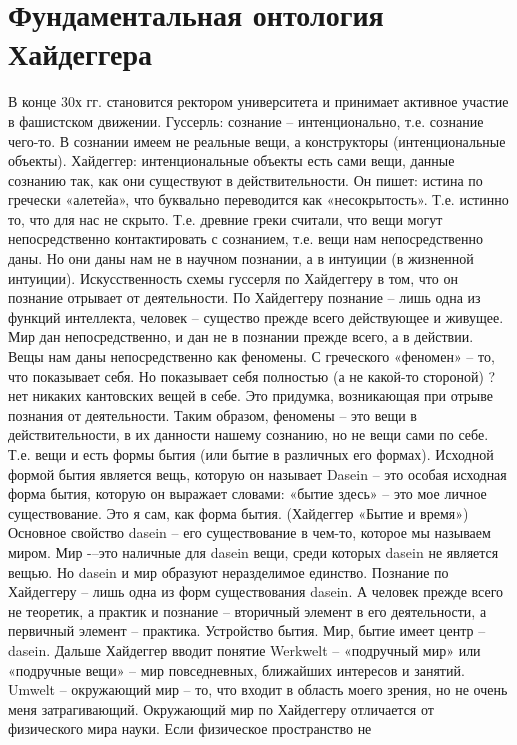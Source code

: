 \documentclass[12pt]{article}
\begin{document}
\section{Фундаментальная онтология Хайдеггера}
В конце 30х гг. становится ректором университета и принимает активное участие в фашистском движении.
Гуссерль:  сознание  –  интенционально,  т.е.  сознание  чего-то.  В  сознании  имеем  не  реальные  вещи,  а
конструкторы (интенциональные объекты).
Хайдеггер:  интенциональные  объекты  есть  сами  вещи,  данные  сознанию  так,  как  они  существуют  в
действительности.
Он пишет: истина по гречески «алетейа», что буквально переводится как «несокрытость». Т.е. истинно то, что
для нас не скрыто. Т.е. древние греки считали, что вещи могут непосредственно контактировать с сознанием,
т.е. вещи нам непосредственно даны. Но они даны нам не в научном познании, а в интуиции (в жизненной
интуиции).
Искусственность  схемы  гуссерля  по  Хайдеггеру  в  том,  что  он  познание  отрывает  от  деятельности.  По
Хайдеггеру познание – лишь одна из функций интеллекта, человек – существо прежде всего действующее и
живущее. Мир дан непосредственно, и дан не в познании прежде всего, а в действии.
Вещы  нам  даны  непосредственно  как  феномены.  С  греческого  «феномен»  –  то,  что  показывает  себя.  Но
показывает себя полностью (а не какой-то стороной) ? нет никаких кантовских вещей в себе. Это придумка,
возникающая при отрыве познания от деятельности.
Таким образом, феномены – это вещи в действительности, в их данности нашему сознанию, но не вещи сами по
себе. Т.е. вещи и есть формы бытия (или бытие в различных его формах).
Исходной формой бытия является вещь, которую он называет Dasein – это особая исходная форма бытия,
которую он выражает словами: «бытие здесь» – это мое личное существование. Это я сам, как форма бытия.
(Хайдеггер «Бытие и время»)
Основное свойство dasein – его существование в чем-то, которое мы называем миром. Мир -–это наличные для
dasein вещи, среди которых dasein не является вещью. Но dasein и мир образуют неразделимое единство.
Познание по Хайдеггеру – лишь одна из форм существования dasein. А человек прежде всего не теоретик, а
практик и познание – вторичный элемент в его деятельности, а первичный элемент – практика.
Устройство бытия.
Мир, бытие имеет центр – dasein.
Дальше Хайдеггер вводит понятие Werkwelt – «подручный мир» или «подручные вещи» – мир повседневных,
ближайших интересов и занятий. Umwelt – окружающий мир – то, что входит в область моего зрения, но не
очень меня затрагивающий.
Окружающий мир по Хайдеггеру отличается от физического мира науки. Если физическое пространство не
\end{document}
